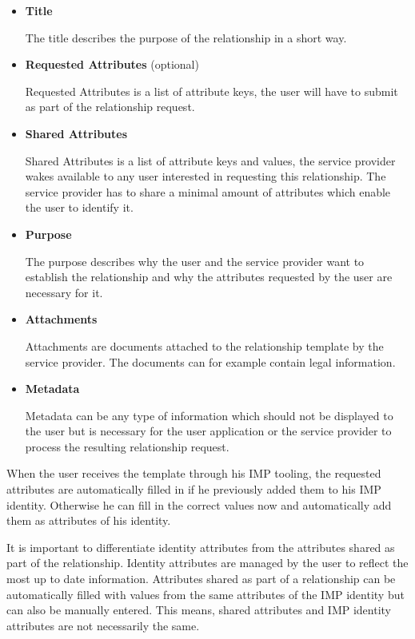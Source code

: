 \begin{itemize}
    \item \textbf{Title}
    
    The title describes the purpose of the relationship in a short way.
    
    \item \textbf{Requested Attributes} (optional)
    
    Requested Attributes is a list of attribute keys, the user will have to submit as part of the relationship request.
    
    \item \textbf{Shared Attributes}
    
    Shared Attributes is a list of attribute keys and values, the service provider wakes available to any user interested in requesting this relationship. The service provider has to share a minimal amount of attributes which enable the user to identify it. 
    
    \item \textbf{Purpose}
    
    The purpose describes why the user and the service provider want to establish the relationship and why the attributes requested by the user are necessary for it.
    
    \item \textbf{Attachments}
    
    Attachments are documents attached to the relationship template by the service provider. The documents can for example contain legal information.
    
    \item \textbf{Metadata}
    
    Metadata can be any type of information which should not be displayed to the user but is necessary for the user application or the service provider to process the resulting relationship request.
    
\end{itemize}

When the user receives the template through his IMP tooling, the requested attributes are automatically filled in if he previously added them to his IMP identity. Otherwise he can fill in the correct values now and automatically add them as attributes of his identity.

It is important to differentiate identity attributes from the attributes shared as part of the relationship. Identity attributes are managed by the user to reflect the most up to date information. Attributes shared as part of a relationship can be automatically filled with values from the same attributes of the IMP identity but can also be manually entered. This means, shared attributes and IMP identity attributes are not necessarily the same.

